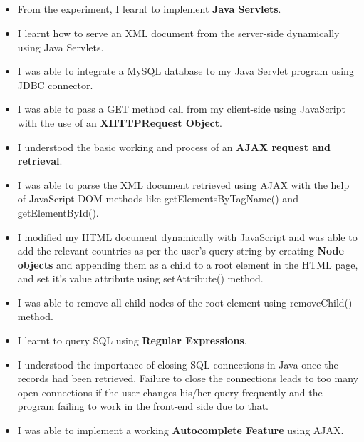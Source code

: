 \documentclass[12pt, a4]{article}
\begin{document}
\newpage
\subsection*{}
\begin{itemize}

\item From the experiment, I learnt to implement \textbf{Java Servlets}.
\item I learnt how to serve an XML document from the server-side dynamically using Java Servlets.
\item I was able to integrate a MySQL database to my Java Servlet program using JDBC connector.
\item I was able to pass a GET method call from my client-side using JavaScript with the use of an \textbf{XHTTPRequest Object}.
\item I understood the basic working and process of an \textbf{AJAX request and retrieval}.
\item I was able to parse the XML document retrieved using AJAX with the help of JavaScript DOM methods like getElementsByTagName() and getElementById().
\item I modified my HTML document dynamically with JavaScript and was able to add the relevant countries as per the user's query string by creating \textbf{Node objects} and appending them as a child to a root element in the HTML page, and set it's value attribute using setAttribute() method.
\item I was able to remove all child nodes of the root element using removeChild() method.
\item I learnt to query SQL using \textbf{Regular Expressions}.
\item I understood the importance of closing SQL connections in Java once the records had been retrieved. Failure to close the connections leads to too many open connections if the user changes his/her query frequently and the program failing to work in the front-end side due to that.
\item I was able to implement a working \textbf{Autocomplete Feature} using AJAX.


\end{itemize}
\end{document}
